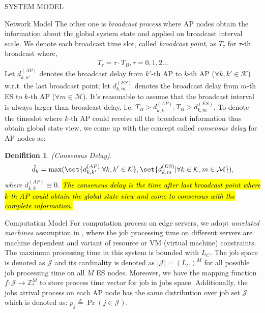 \documentclass[10pt, conference, letterpaper]{IEEEtran}
\newtheorem{definition}{Denifition}
\newcommand{\domZ}{\mathbb{Z}_{*}}
\newcommand{\define}{\triangleq}
\DeclarePairedDelimiter\set\{\}
\newcommand{\apSet}{\mathcal{K}}
\newcommand{\esSet}{\mathcal{M}}
\newcommand{\jSet}{\mathcal{J}}
\begin{document}
\begin{section}{SYSTEM MODEL}
\begin{subsection}{Network Model}
            The other one is \emph{broadcast process} where AP nodes obtain the information about the global system state and applied on broadcast interval scale. We denote each broadcast time slot, called \emph{broadcast point}, as $T_\tau$ for $\tau$-th broadcast where,
            \begin{align}
                T_\tau = \tau \cdot T_B, \tau=0,1,2\dots
            \end{align} 
            Let $d^{(AP)}_{k,k'}$ denotes the broadcast delay from $k'$-th AP to $k$-th AP ($\forall k,k'\in\apSet$) w.r.t. the last broadcast point; let $d^{(ES)}_{k,m}$ denotes the broadcast delay from $m$-th ES to $k$-th AP ($\forall m\in\esSet$). It's reasonable to assume that the broadcast interval is always larger than broadcast delay, i.e. $T_B > d^{(AP)}_{k,k'}, T_B > d^{(ES)}_{k,m}$. To denote the timeslot where $k$-th AP could receive all the broadcast information thus obtain global state view, we come up with the concept called \emph{consensus delay} for AP nodes as:
            \begin{definition}
                (Consensus Delay).
                \begin{align}
                    \hat{d}_k = \max(\set{d^{(AP)}_{k,k'}|\forall k,k'\in\apSet}, \set{d^{(ES)}_{k,m}|\forall k\in\apSet,m\in\esSet}),
                \end{align}
                where $d^{(AP)}_{k,k} \equiv 0$. \hl{The consensus delay is the time after last broadcast point where $k$-th AP could obtain the global state view and come to consensus with the complete information.}
            \end{definition}
        \end{subsection}

        \begin{subsection}{Computation Model}
            For computation process on edge servers, we adopt \emph{unrelated machines} assumption in \cite{tan-online}, where the job processing time on different servers are machine dependent and variant of resource or VM (virtual machine) constraints.
            The maximum processing time in this system is bounded with $L_C$.
            The job space is denoted as $\jSet$ and its cardinality is denoted as $|\jSet|=(L_C)^M$ for all possible job processing time on all $M$ ES nodes.
            Moreover, we have the mapping function $f:\jSet \to \domZ^M$ to store process time vector for job in jobs space.
            Additionally, the jobs arrival process on each AP node has the same distribution over job set $\jSet$ which is denoted as: $p_j \define \Pr(j\in\jSet)$.
            

\end{subsection}
\end{section}
\end{document}
